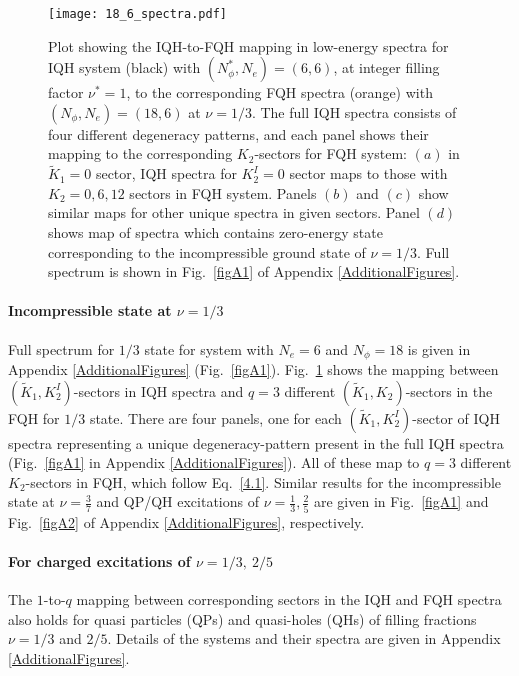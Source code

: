 \documentclass[prb,aps,epsfig,longbibliography,twocolumn]{revtex4-1}
\newcommand{\np}{N_{\phi}}
\begin{document}
\begin{figure}[h]
	\texttt{[image: 18\_6\_spectra.pdf]}
	\caption{ Plot showing the IQH-to-FQH mapping in low-energy spectra for IQH system (black) with $(\np^{*},N_e)=(6,6)$, at integer filling factor $\nu^{*}=1$, to the corresponding FQH spectra (orange) with $(\np,N_e)=(18,6)$ at $\nu=1/3$. The full IQH spectra consists of four different degeneracy patterns, and each panel shows their mapping to the corresponding $K_2$-sectors for FQH system: $(a)$ in $\tilde{K}_1=0$ sector, IQH spectra for ${K}_2^{I}=0$ sector maps to those with ${K}_2=0,6,12$ sectors in FQH system. Panels $(b)$ and $(c)$ show similar maps for other unique spectra in given sectors. Panel $(d)$ shows map of spectra which contains  zero-energy state corresponding to the incompressible ground state of $\nu=1/3$. Full spectrum is shown in Fig.~\ref{figA1} of Appendix \ref{AdditionalFigures}.
	}
	\label{fig4}
\end{figure}

\paragraph{Incompressible state at $\nu=1/3$}
Full spectrum for $1/3$ state for system with $N_e=6$ and $\np=18$ is given in Appendix \ref{AdditionalFigures} (Fig.~\ref{figA1}). Fig.~\ref{fig4} shows the mapping between $(\tilde{K}_1,K^I_2)$-sectors in IQH spectra and $q=3$ different $(\tilde{K}_1,K_2)$-sectors in the FQH for $1/3$ state. There are four panels, one for each $(\tilde{K}_1,K^I_2)$-sector of IQH spectra representing a unique degeneracy-pattern present in the full IQH spectra (Fig.~\ref{figA1} in  Appendix \ref{AdditionalFigures}). All of these map to $q=3$ different $K_2$-sectors in FQH, which follow Eq.~\ref{4.1}. Similar results for the incompressible state at $\nu=\frac{3}{7}$ and
QP/QH excitations of $\nu=\frac{1}{3}, \frac{2}{5}$ are given in
Fig.~\ref{figA1} and Fig.~\ref{figA2} of Appendix \ref{AdditionalFigures}, respectively.

\paragraph{For charged excitations of $\nu=1/3,\ 2/5$}
The $1$-to-$q$ mapping between corresponding sectors in the IQH and FQH spectra also holds for quasi particles (QPs) and quasi-holes (QHs) of filling fractions $\nu=1/3$ and $2/5$. Details of the systems and their spectra are given in Appendix \ref{AdditionalFigures}.
\end{document}

